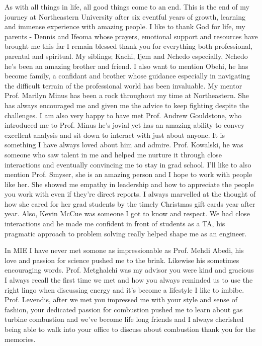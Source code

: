 \thispagestyle{plain}

\justifying


As with all things in life, all good things come to an end. This is the end of my journey at Northeastern University after six eventful years of growth, learning and immense experience with amazing people. I like to thank God for life, my parents - Dennis and Ifeoma whose prayers, emotional support and resources have brought me this far I remain blessed thank you for everything both professional, parental and spiritual. My siblings; Kachi, Ijem and Nchedo especially, Nchedo he's been an amazing brother and friend. I also want to mention Obehi, he has become family,  a confidant and brother whose guidance especially in navigating the difficult terrain of the professional world has been invaluable. My mentor Prof. Marilyn Minus has been a rock throughout my time at Northeastern. She has always encouraged me and given me the advice to keep fighting despite the challenges. I am also very happy to have met Prof. Andrew Gouldstone, who introduced me to Prof. Minus he's jovial yet has an amazing ability to convey excellent analysis and sit down to interact with just about anyone. It is something I have always loved about him and admire. Prof. Kowalski, he was someone who saw talent in me and helped me nurture it through close interactions and eventually convincing me to stay in grad school. I'll like to also mention Prof. Smyser, she is an amazing person and I hope to work with people like her. She showed me empathy in leadership and how to appreciate the people you work with even if they're direct reports. I always marvelled at the thought of how she cared for her grad students by the timely Christmas gift cards year after year. Also, Kevin McCue was someone I got to know and respect. We had close interactions and he made me confident in front of students as a TA, his pragmatic approach to problem solving really helped shape me as an engineer. 

In MIE I have never met somone as impressionable as Prof. Mehdi Abedi, his love and passion for science pushed me to the brink. Likewise his sometimes encouraging words. Prof. Metghalchi was my advisor you were kind and gracious I always recall the first time we met and how you always reminded us to use the right lingo when discussing energy and it's become a lifestyle I like to imbibe. Prof. Levendis, after we met you impressed me with your style and sense of fashion, your dedicated passion for combustion pushed me to learn about gas turbine combustion and we've become life long friends and I always cherished being able to walk into your office to discuss about combustion thank you for the memories. 


